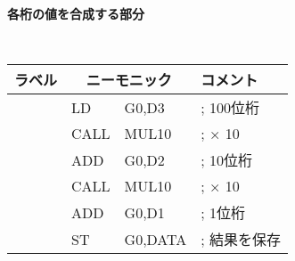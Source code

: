 \begin{center}
{\bf 各桁の値を合成する部分}
{\small\tt
\begin{tabular}{|l|l l l|} \hline
ラベル & \multicolumn{2}{|c}{ニーモニック} & コメント    \\
\hline
       & LD   & G0,D3         & ; 100位桁    \\
       & CALL & MUL10         & ; × 10      \\
       & ADD  & G0,D2         & ; 10位桁     \\
       & CALL & MUL10         & ; × 10      \\
       & ADD  & G0,D1         & ; 1位桁      \\
       & ST   & G0,DATA       & ; 結果を保存 \\
\hline
\end{tabular}
}
\end{center}

\vfill
\begin{center}
\end{center}

\newpage
